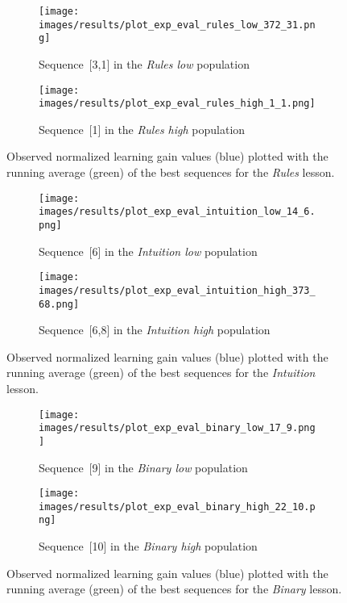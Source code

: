 \begin{figure}[ht]
	\begin{subfigure}{0.9\linewidth}
	\centering
	\texttt{[image: images/results/plot\_exp\_eval\_rules\_low\_372\_31.png]}
	\caption{Sequence~[3,1] in the \emph{Rules low} population}
	\label{fig:exp_eval_rules_low_372}
	\end{subfigure}
	\hfill
	\begin{subfigure}{0.9\linewidth}
	\centering
	\texttt{[image: images/results/plot\_exp\_eval\_rules\_high\_1\_1.png]}
	\caption{Sequence~[1] in the \emph{Rules high} population}
	\label{fig:exp_eval_rules_high_1}
	\end{subfigure}
	\caption{Observed normalized learning gain values (blue) plotted with the
		running average (green) of the best sequences for the \emph{Rules}
	lesson.}
	\label{fig:exp_eval_rules}
\end{figure}

\begin{figure}[ht]
	\begin{subfigure}{0.9\linewidth}
	\centering
	\texttt{[image: images/results/plot\_exp\_eval\_intuition\_low\_14\_6.png]}
	\caption{Sequence~[6] in the \emph{Intuition low} population}
	\label{fig:exp_eval_intuition_low_14}
	\end{subfigure}
	\hfill
	\begin{subfigure}{0.9\linewidth}
	\centering
	\texttt{[image: images/results/plot\_exp\_eval\_intuition\_high\_373\_68.png]}
	\caption{Sequence~[6,8] in the \emph{Intuition high} population}
	\label{fig:exp_eval_intuition_high_373}
	\end{subfigure}
	\caption{Observed normalized learning gain values (blue) plotted with the
		running average (green) of the best sequences for the \emph{Intuition}
	lesson.}
	\label{fig:exp_eval_intuition}
\end{figure}

\begin{figure}[ht]
	\begin{subfigure}{0.9\linewidth}
	\centering
	\texttt{[image: images/results/plot\_exp\_eval\_binary\_low\_17\_9.png]}
	\caption{Sequence~[9] in the \emph{Binary low} population}
	\label{fig:exp_eval_binary_low_17}
	\end{subfigure}
	\hfill
	\begin{subfigure}{0.9\linewidth}
	\centering
	\texttt{[image: images/results/plot\_exp\_eval\_binary\_high\_22\_10.png]}
	\caption{Sequence~[10] in the \emph{Binary high} population}
	\label{fig:exp_eval_binary_high_10}
	\end{subfigure}
	\caption{Observed normalized learning gain values (blue) plotted with the
		running average (green) of the best sequences for the \emph{Binary}
	lesson.}
	\label{fig:exp_eval_binary}
\end{figure}

